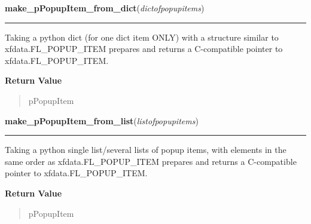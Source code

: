     \label{xformslib:library:make_pPopupItem_from_dict}

    \vspace{0.5ex}

\hspace{.8\funcindent}\begin{boxedminipage}{\funcwidth}

    \raggedright \textbf{make\_pPopupItem\_from\_dict}(\textit{dictofpopupitems})

    \vspace{-1.5ex}

    \rule{\textwidth}{0.5\fboxrule}
\setlength{\parskip}{2ex}
    Taking a python dict (for one dict item ONLY) with a structure similar 
    to xfdata.FL\_POPUP\_ITEM prepares and returns a C-compatible pointer 
    to xfdata.FL\_POPUP\_ITEM.

\setlength{\parskip}{1ex}
      \textbf{Return Value}
    \vspace{-1ex}

      \begin{quote}
      pPopupItem

      \end{quote}

    \end{boxedminipage}

    \label{xformslib:library:make_pPopupItem_from_list}

    \vspace{0.5ex}

\hspace{.8\funcindent}\begin{boxedminipage}{\funcwidth}

    \raggedright \textbf{make\_pPopupItem\_from\_list}(\textit{listofpopupitems})

    \vspace{-1.5ex}

    \rule{\textwidth}{0.5\fboxrule}
\setlength{\parskip}{2ex}
    Taking a python single list/several lists of popup items, with elements
    in the same order as xfdata.FL\_POPUP\_ITEM prepares and returns a 
    C-compatible pointer to xfdata.FL\_POPUP\_ITEM.

\setlength{\parskip}{1ex}
      \textbf{Return Value}
    \vspace{-1ex}

      \begin{quote}
      pPopupItem

      \end{quote}

    \end{boxedminipage}

